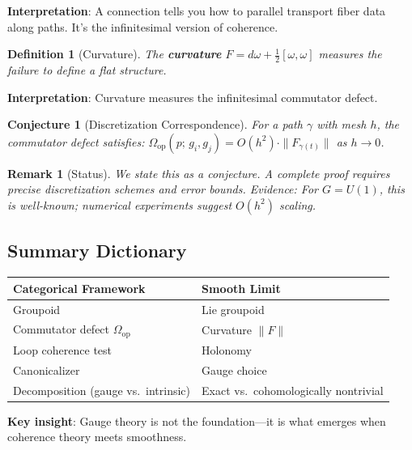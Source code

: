 \documentclass[12pt]{article}
\newtheorem{conjecture}[theorem]{Conjecture}
\newtheorem{definition}[theorem]{Definition}
\newtheorem{remark}[theorem]{Remark}
\begin{document}
\textbf{Interpretation}: A connection tells you how to parallel transport fiber data along paths. It's the infinitesimal version of coherence.

\begin{definition}[Curvature]
\emph{The \textbf{curvature} $F = d\omega + \frac{1}{2}[\omega, \omega]$ measures the failure to define a flat structure.}
\end{definition}

\textbf{Interpretation}: Curvature measures the infinitesimal commutator defect.

\begin{conjecture}[Discretization Correspondence]
\emph{For a path $\gamma$ with mesh $h$, the commutator defect satisfies:} $\Omega_{\mathrm{op}}(p;\, g_i, g_j) = O(h^2) \cdot \|F_{\gamma(t)}\|$ \emph{as $h \to 0$.}
\end{conjecture}

\begin{remark}[Status]
\emph{We state this as a conjecture. A complete proof requires precise discretization schemes and error bounds. Evidence: For $G = U(1)$, this is well-known; numerical experiments suggest $O(h^2)$ scaling.}
\end{remark}

\subsection{Summary Dictionary}

\begin{table}[ht]
\centering
\begin{tabular}{@{}ll@{}}
\toprule
\textbf{Categorical Framework} & \textbf{Smooth Limit} \\
\midrule
Groupoid & Lie groupoid \\
Commutator defect $\Omega_{\mathrm{op}}$ & Curvature $\|F\|$ \\
Loop coherence test & Holonomy \\
Canonicalizer & Gauge choice \\
Decomposition (gauge vs.\ intrinsic) & Exact vs.\ cohomologically nontrivial \\
\bottomrule
\end{tabular}
\end{table}

\textbf{Key insight}: Gauge theory is not the foundation---it is what emerges when coherence theory meets smoothness.

\end{document}

